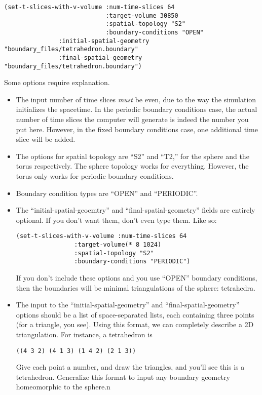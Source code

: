 \message{ !name(users_guide.tex)}\documentclass{article}
\begin{document}
\begin{lstlisting}
(set-t-slices-with-v-volume :num-time-slices 64
                            :target-volume 30850
                            :spatial-topology "S2"
                            :boundary-conditions "OPEN"
               :initial-spatial-geometry "boundary_files/tetrahedron.boundary"
               :final-spatial-geometry "boundary_files/tetrahedron.boundary")
\end{lstlisting}

Some options require explanation. 
\begin{itemize}
\item The input number of time slices \textit{must} be even, due to
  the way the simulation initializes the spacetime. In the periodic
  boundary conditions case, the actual number of time slices the
  computer will generate is indeed the number you put here. However,
  in the fixed boundary conditions case, one additional time slice
  will be added.
\item The options for spatial topology are ``S2'' and ``T2,'' for the
  sphere and the torus respectively. The sphere topology works for
  everything. However, the torus only works for periodic boundary
  conditions.
\item Boundary condition types are ``OPEN'' and ``PERIODIC''.
\item The ``initial-spatial-geoemtry'' and ``final-spatial-geometry''
  fields are entirely optional. If you don't want them, don't even
  type them. Like so:
\begin{lstlisting}
(set-t-slices-with-v-volume :num-time-slices 64
			    :target-volume(* 8 1024)
			    :spatial-topology "S2"
			    :boundary-conditions "PERIODIC")
\end{lstlisting}
If you don't include these options and you use ``OPEN'' boundary
conditions, then the boundaries will be minimal triangulations of the
sphere: tetrahedra.
\item The input to the ``initial-spatial-geometry'' and
  ``final-spatial-geometry'' options should be a list of
  space-separated lists, each containing three points (for a triangle,
  you see). Using this format, we can completely describe a 2D
  triangulation. For instance, a tetrahedron is
\begin{lstlisting}
((4 3 2) (4 1 3) (1 4 2) (2 1 3))
\end{lstlisting}
Give each point a number, and draw the triangles, and you'll see this
is a tetrahedron. Generalize this format to input any boundary
geometry homeomorphic to the sphere.n
\end{itemize}
\end{document}
